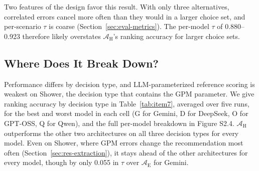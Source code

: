 \documentclass[final,3p,times]{elsarticle}
\begin{document}
Two features of the design favor this result. With only three alternatives, correlated errors cancel more often than they would in a larger choice set, and per-scenario $\tau$ is coarse (Section~\ref{sec:eval-metrics}). The per-model $\tau$ of 0.880--0.923 therefore likely overstates $\mathcal{A}_{\text{H}}$'s ranking accuracy for larger choice sets.

\FloatBarrier
\subsection{Where Does It Break Down?}
\label{sec:res-bytype}
Performance differs by decision type, and LLM-parameterized reference scoring is weakest on Shower, the decision type that contains the GPM parameter. We give ranking accuracy by decision type in Table~\ref{tab:item7}, averaged over five runs, for the best and worst model in each cell (G for Gemini, D for DeepSeek, O for GPT-OSS, Q for Qwen), and the full per-model breakdown in Figure S2.4. $\mathcal{A}_{\text{H}}$ outperforms the other two architectures on all three decision types for every model. Even on Shower, where GPM errors change the recommendation most often (Section~\ref{sec:res-extraction}), it stays ahead of the other architectures for every model, though by only 0.055 in $\tau$ over $\mathcal{A}_{\text{E}}$ for Gemini.
\end{document}
